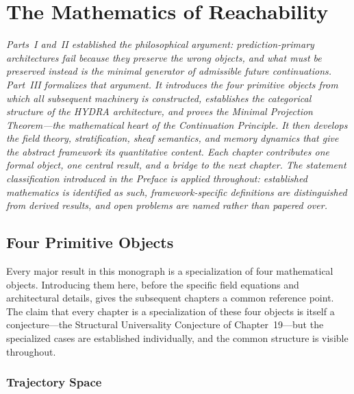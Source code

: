 \documentclass[12pt, oneside]{book}
\theoremstyle{flyxion}
\theoremstyle{definition}
\begin{document}
\part{The Mathematics of Reachability}

\noindent\textit{Parts~I and~II established the philosophical
argument: prediction-primary architectures fail because they
preserve the wrong objects, and what must be preserved instead
is the minimal generator of admissible future continuations.
Part~III formalizes that argument. It introduces the four
primitive objects from which all subsequent machinery is
constructed, establishes the categorical structure of the
HYDRA architecture, and proves the Minimal Projection
Theorem---the mathematical heart of the Continuation Principle.
It then develops the field theory, stratification, sheaf
semantics, and memory dynamics that give the abstract framework
its quantitative content. Each chapter contributes one formal
object, one central result, and a bridge to the next chapter.
The statement classification introduced in the Preface is
applied throughout: established mathematics is identified as
such, framework-specific definitions are distinguished from
derived results, and open problems are named rather than
papered over.}

\bigskip

\chapter{Four Primitive Objects}

Every major result in this monograph is a specialization of
four mathematical objects. Introducing them here, before the
specific field equations and architectural details, gives the
subsequent chapters a common reference point. The claim that
every chapter is a specialization of these four objects is
itself a conjecture---the Structural Universality Conjecture
of Chapter~19---but the specialized cases are established
individually, and the common structure is visible throughout.

\section{Trajectory Space}
\end{document}
